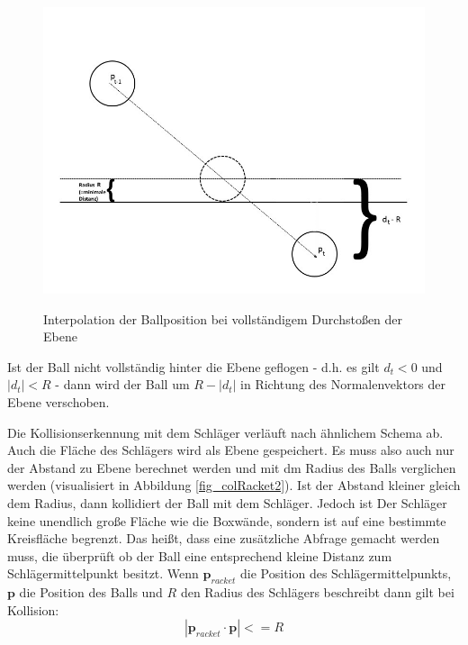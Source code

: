 \begin{figure}[h]
   \begin{center}
       \includegraphics[scale=0.5]{bilder/interpolation}\label{fig_interpolation}
   \end{center}
    
    \caption{Interpolation der Ballposition bei vollständigem Durchstoßen der Ebene}
        \label{fig_interpol}
\end{figure} 

Ist der Ball nicht vollständig hinter die Ebene geflogen - d.h. es gilt $d_t<0$ und $|d_t|<R $ - dann wird der Ball um $R - |d_t|$ in Richtung des Normalenvektors der Ebene verschoben.

Die Kollisionserkennung mit dem Schläger verläuft nach ähnlichem Schema ab. Auch die Fläche des Schlägers wird als Ebene gespeichert. Es muss also auch nur der Abstand zu Ebene berechnet werden und mit dm Radius des Balls verglichen werden (visualisiert in Abbildung \ref{fig_colRacket2}). Ist der Abstand kleiner gleich dem Radius, dann kollidiert der Ball mit dem Schläger. Jedoch ist Der Schläger keine unendlich große Fläche wie die  Boxwände, sondern ist auf eine bestimmte Kreisfläche begrenzt. Das heißt, dass eine zusätzliche Abfrage gemacht werden muss, die überprüft ob der Ball eine entsprechend kleine Distanz zum Schlägermittelpunkt besitzt.
Wenn $\mathbf{p}_{racket}$ die Position des Schlägermittelpunkts, $\mathbf{p}$ die Position des Balls und $R$ den Radius des Schlägers beschreibt dann gilt bei Kollision:
\begin{equation}
	|\mathbf{p}_{racket}\cdot\mathbf{p}| <= R
\end{equation}

